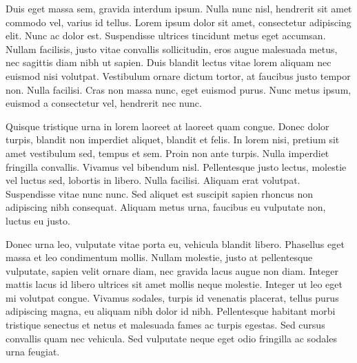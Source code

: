 Duis eget massa sem, gravida interdum ipsum. Nulla nunc nisl, hendrerit sit amet commodo vel, varius id tellus. Lorem ipsum dolor sit amet, consectetur adipiscing elit. Nunc ac dolor est. Suspendisse ultrices tincidunt metus eget accumsan. Nullam facilisis, justo vitae convallis sollicitudin, eros augue malesuada metus, nec sagittis diam nibh ut sapien. Duis blandit lectus vitae lorem aliquam nec euismod nisi volutpat. Vestibulum ornare dictum tortor, at faucibus justo tempor non. Nulla facilisi. Cras non massa nunc, eget euismod purus. Nunc metus ipsum, euismod a consectetur vel, hendrerit nec nunc.


Quisque tristique urna in lorem laoreet at laoreet quam congue. Donec dolor turpis, blandit non imperdiet aliquet, blandit et felis. In lorem nisi, pretium sit amet vestibulum sed, tempus et sem. Proin non ante turpis. Nulla imperdiet fringilla convallis. Vivamus vel bibendum nisl. Pellentesque justo lectus, molestie vel luctus sed, lobortis in libero. Nulla facilisi. Aliquam erat volutpat. Suspendisse vitae nunc nunc. Sed aliquet est suscipit sapien rhoncus non adipiscing nibh consequat. Aliquam metus urna, faucibus eu vulputate non, luctus eu justo.

Donec urna leo, vulputate vitae porta eu, vehicula blandit libero. Phasellus eget massa et leo condimentum mollis. Nullam molestie, justo at pellentesque vulputate, sapien velit ornare diam, nec gravida lacus augue non diam. Integer mattis lacus id libero ultrices sit amet mollis neque molestie. Integer ut leo eget mi volutpat congue. Vivamus sodales, turpis id venenatis placerat, tellus purus adipiscing magna, eu aliquam nibh dolor id nibh. Pellentesque habitant morbi tristique senectus et netus et malesuada fames ac turpis egestas. Sed cursus convallis quam nec vehicula. Sed vulputate neque eget odio fringilla ac sodales urna feugiat.
